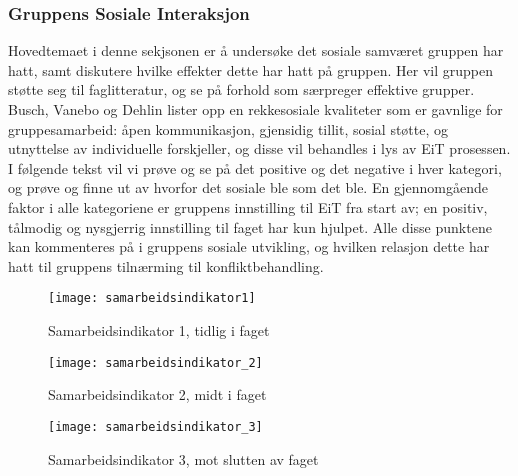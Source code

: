 \subsubsection{Gruppens Sosiale Interaksjon}

Hovedtemaet i denne sekjsonen er å undersøke det sosiale samværet gruppen har hatt, samt diskutere hvilke effekter dette har hatt på gruppen. Her vil gruppen støtte seg til faglitteratur\cite{orgorg}, og se på forhold som særpreger effektive grupper. Busch, Vanebo og Dehlin\cite[p.~257]{orgorg} lister opp en rekkesosiale kvaliteter som er gavnlige for gruppesamarbeid: åpen kommunikasjon, gjensidig tillit, sosial støtte, og utnyttelse av individuelle forskjeller, og disse vil behandles i lys av EiT prosessen. I følgende tekst vil vi prøve og se på det positive og det negative i hver kategori, og prøve og finne ut av hvorfor det sosiale ble som det ble. En gjennomgående faktor i alle kategoriene er gruppens innstilling til EiT fra start av; en positiv, tålmodig og nysgjerrig innstilling til faget har kun hjulpet. Alle disse punktene kan kommenteres på i gruppens sosiale utvikling, og hvilken relasjon dette har hatt til gruppens tilnærming til konfliktbehandling. 

\begin{figure}[h!]
  \caption{Samarbeidsindikator 1, tidlig i faget}
  \centering
    \texttt{[image: samarbeidsindikator1]}
\end{figure}\label{samarbeidsindikator1}

\begin{figure}[h!]
  \caption{Samarbeidsindikator 2, midt i faget}
  \centering
    \texttt{[image: samarbeidsindikator\_2]}
\end{figure}\label{samarbeidsindikator2}

\begin{figure}[h!]
  \caption{Samarbeidsindikator 3, mot slutten av faget}
  \centering
    \texttt{[image: samarbeidsindikator\_3]}
\end{figure}\label{samarbeidsindikator3}

